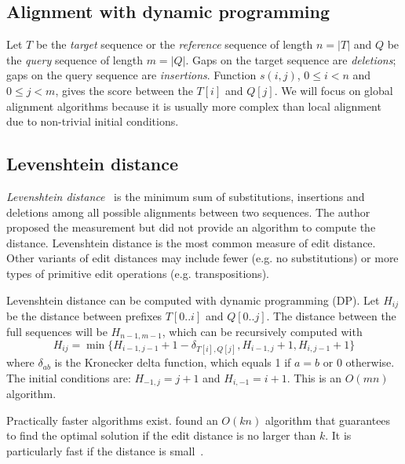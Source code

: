\documentclass{bioinfo}
\begin{document}
\begin{methods}
\section{Alignment with dynamic programming}

Let $T$ be the \emph{target} sequence or the \emph{reference} sequence of
length $n=|T|$ and $Q$ be the \emph{query} sequence of length $m=|Q|$. Gaps on
the target sequence are \emph{deletions}; gaps on the query sequence are
\emph{insertions}. Function $s(i,j)$, $0\le i<n$ and $0\le j<m$, gives the
score between the $T[i]$ and $Q[j]$. We will focus on global alignment
algorithms because it is usually more complex than local alignment due to
non-trivial initial conditions.

\subsection{Levenshtein distance}

\emph{Levenshtein distance}~\citep{Levenshtein:1966aa} is the minimum sum of
substitutions, insertions and deletions among all possible alignments between
two sequences. The author proposed the measurement but did not provide an
algorithm to compute the distance. Levenshtein distance is the most common
measure of edit distance. Other variants of edit distances may include fewer
(e.g. no substitutions) or more types of primitive edit operations (e.g.
transpositions).

Levenshtein distance can be computed with dynamic programming (DP). Let
$H_{ij}$ be the distance between prefixes $T[0..i]$ and $Q[0..j]$. The distance
between the full sequences will be $H_{n-1,m-1}$, which can be recursively
computed with
\begin{equation}\label{eq:ed}
H_{ij}=\min\{H_{i-1,j-1}+1-\delta_{T[i],Q[j]}, H_{i-1,j}+1, H_{i,j-1}+1\}
\end{equation}
where $\delta_{ab}$ is the Kronecker delta function, which equals 1 if $a=b$ or
0 otherwise. The initial conditions are: $H_{-1,j}=j+1$ and $H_{i,-1}=i+1$.
This is an $O(mn)$ algorithm.

Practically faster algorithms exist. \citet{Landau:1986aa} found an $O(kn)$
algorithm that guarantees to find the optimal solution if the edit distance is
no larger than $k$. It is particularly fast if the distance is
small~\citep{Sosic:2015aa}.


\end{methods}
\end{document}
